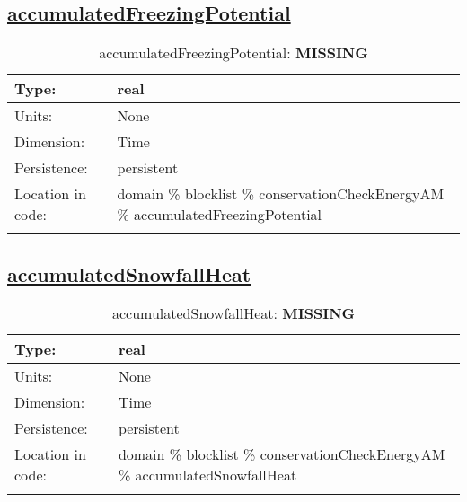\subsection[accumulatedFreezingPotential]{\hyperref[sec:var_tab_conservationCheckEnergyAM]{accumulatedFreezingPotential}}
\label{subsec:var_sec_conservationCheckEnergyAM_accumulatedFreezingPotential}
\begin{center}
\begin{longtable}{| p{2.0in} | p{4.0in} |}
        \hline 
        Type: & real \\
        \hline 
        Units: & \si{None} \\
        \hline 
        Dimension: & Time \\
        \hline 
        Persistence: & persistent \\
        \hline 
         Location in code: & domain \% blocklist \% conservationCheckEnergyAM \% accumulatedFreezingPotential \\
         \hline 
    \caption{accumulatedFreezingPotential: {\bf \color{red} MISSING}}
\end{longtable}
\end{center}
\subsection[accumulatedSnowfallHeat]{\hyperref[sec:var_tab_conservationCheckEnergyAM]{accumulatedSnowfallHeat}}
\label{subsec:var_sec_conservationCheckEnergyAM_accumulatedSnowfallHeat}
\begin{center}
\begin{longtable}{| p{2.0in} | p{4.0in} |}
        \hline 
        Type: & real \\
        \hline 
        Units: & \si{None} \\
        \hline 
        Dimension: & Time \\
        \hline 
        Persistence: & persistent \\
        \hline 
         Location in code: & domain \% blocklist \% conservationCheckEnergyAM \% accumulatedSnowfallHeat \\
         \hline 
    \caption{accumulatedSnowfallHeat: {\bf \color{red} MISSING}}
\end{longtable}
\end{center}
